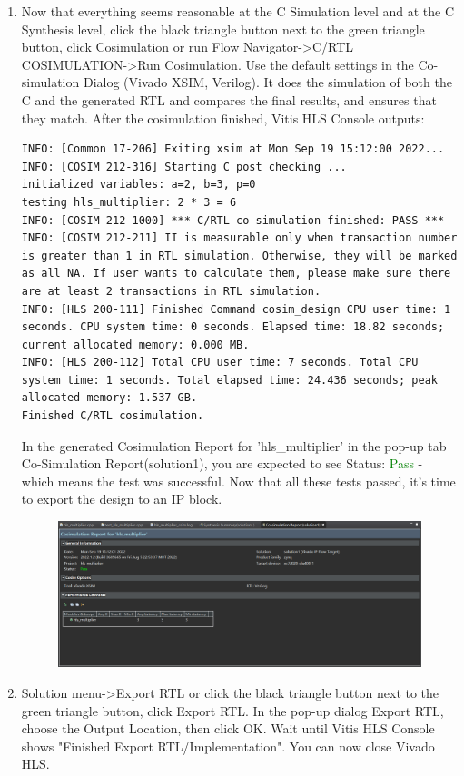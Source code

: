 \documentclass[a4paper,12pt,twoside]{article}
\begin{document}
\begin{enumerate}
\begin{figure}[H]
    \end{figure}
    \item Now that everything seems reasonable at the C Simulation level and at the C Synthesis level, click the black triangle button next to the green triangle button, click Cosimulation or run Flow Navigator->C/RTL COSIMULATION->Run Cosimulation. Use the default settings in the Co-simulation Dialog (Vivado XSIM, Verilog). It does the simulation of both the C and the generated RTL and compares the final results, and ensures that they match. After the cosimulation finished, Vitis HLS Console outputs:
    \begin{verbatim}
INFO: [Common 17-206] Exiting xsim at Mon Sep 19 15:12:00 2022...
INFO: [COSIM 212-316] Starting C post checking ...
initialized variables: a=2, b=3, p=0 
testing hls_multiplier: 2 * 3 = 6 
INFO: [COSIM 212-1000] *** C/RTL co-simulation finished: PASS ***
INFO: [COSIM 212-211] II is measurable only when transaction number is greater than 1 in RTL simulation. Otherwise, they will be marked as all NA. If user wants to calculate them, please make sure there are at least 2 transactions in RTL simulation.
INFO: [HLS 200-111] Finished Command cosim_design CPU user time: 1 seconds. CPU system time: 0 seconds. Elapsed time: 18.82 seconds; current allocated memory: 0.000 MB.
INFO: [HLS 200-112] Total CPU user time: 7 seconds. Total CPU system time: 1 seconds. Total elapsed time: 24.436 seconds; peak allocated memory: 1.537 GB.
Finished C/RTL cosimulation.
    \end{verbatim}
    In the generated Cosimulation Report for 'hls\_multiplier' in the pop-up tab Co-Simulation Report(solution1), you are expected to see Status: \textcolor{green}{Pass} - which means the test was successful. Now that all these tests passed, it's time to export the design to an IP block.
    \begin{figure}[H]
        \centering
        \includegraphics[width=\textwidth]{images/2.png}
    \end{figure}
    \item Solution menu->Export RTL or click the black triangle button next to the green triangle button, click Export RTL. In the pop-up dialog Export RTL, choose the Output Location, then click OK. Wait until Vitis HLS Console shows "Finished Export RTL/Implementation". You can now close Vivado HLS.
\end{enumerate}
\end{document}
